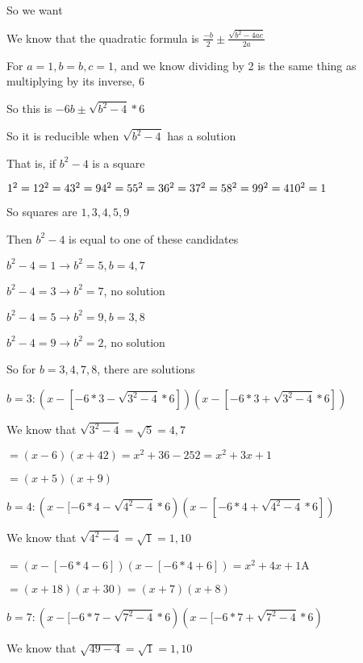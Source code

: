\documentclass[12pt]{article}
\begin{document}
\begin{itemize}
		So we want 

		We know that the quadratic formula is $\frac{-b}{2} \pm \frac{\sqrt{b^2 - 4ac}}{2a}$

		For $a = 1, b = b, c = 1$, and we know dividing by 2 is the same thing as multiplying by its inverse, 6

		So this is $-6b \pm \sqrt{b^2 - 4}*6$

		So it is reducible when $\sqrt{b^2 -4}$ has a solution

		That is, if $b^2 -4$ is a square

		$1^2 = 1\\
		2^2 = 4\\
		3^2 = 9\\
		4^2 = 5\\
		5^2 = 3\\
		6^2 = 3\\
		7^2 = 5\\
		8^2 = 9\\
		9^2 = 4\\
		10^2 = 1\\$

		So squares are $1, 3, 4, 5, 9$

		Then $b^2 - 4$ is equal to one of these candidates

		$b^2 - 4 = 1 \rightarrow b^2 = 5, b = 4,7$

		$b^2 - 4 = 3 \rightarrow b^2 = 7$, no solution

		$b^2  -4 = 5 \rightarrow b^2 = 9, b = 3,8$

		$b^2 - 4 = 9 \rightarrow b^2 = 2$, no solution

		So for $b = 3, 4, 7, 8$, there are solutions

		$b=3: (x -[-6*3 - \sqrt{3^2 - 4}*6])(x - [-6*3 + \sqrt{3^2 - 4}*6])$

		We know that $\sqrt{3^2 - 4} = \sqrt{5} = 4, 7$

		$=(x-6)(x+42) = x^2 + 36 - 252 = x^2 + 3x + 1$
		
		$=(x+5)(x+9)$

		$b=4: (x-[-6*4 - \sqrt{4^2 - 4}*6)(x-[-6*4 + \sqrt{4^2 - 4}*6])$

		We know that $\sqrt{4^2 - 4} = \sqrt{1} = 1, 10$

		$=(x-[-6*4 - 6])(x-[-6*4+6]) = x^2 + 4x + 1$A

		$=(x+18)(x+30) = (x+7)(x+8)$

		$b=7: (x-[-6*7 - \sqrt{7^2 - 4}*6)(x -[-6*7 + \sqrt{7^2 -4}*6)$

		We know that $\sqrt{49-4} = \sqrt{1}= 1, 10$


\end{itemize}
\end{document}
